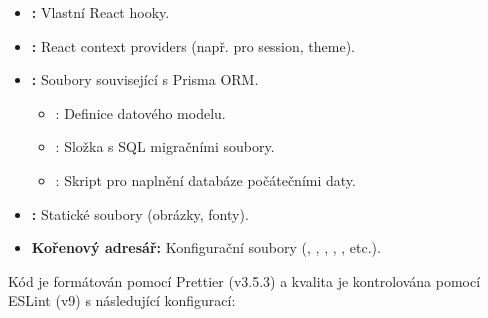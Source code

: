\documentclass[12pt, a4paper]{article}
\begin{document}
\begin{itemize}
\begin{itemize}
        \end{itemize}
    \item \textbf{:} Vlastní React hooky.
    \item \textbf{:} React context providers (např. pro session, theme).
    \item \textbf{:} Soubory související s Prisma ORM.
        \begin{itemize}
            \item {}: Definice datového modelu.
            \item {}: Složka s SQL migračními soubory.
            \item {}: Skript pro naplnění databáze počátečními daty.
        \end{itemize}
    \item \textbf{:} Statické soubory (obrázky, fonty).
    \item \textbf{Kořenový adresář:} Konfigurační soubory (, , , , , etc.).
\end{itemize}
Kód je formátován pomocí Prettier (v3.5.3) a kvalita je kontrolována pomocí ESLint (v9) s následující konfigurací:
\end{document}

